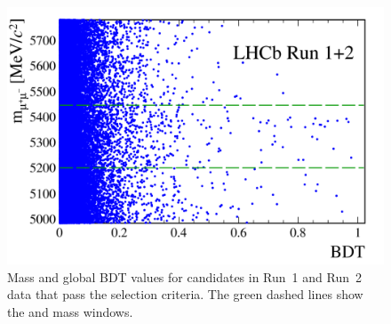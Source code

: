 \begin{figure}[tbp]
    \centering
    \includegraphics[width=\textwidth]{./Figs/Selection/hidef_Fig3.png}
    \caption{Mass and global BDT values for candidates in Run~1 and Run~2 data that pass the \bmumu selection criteria. The green dashed lines show the \bs and \bd mass windows.}
    \label{fig:BFdata}
\end{figure}

